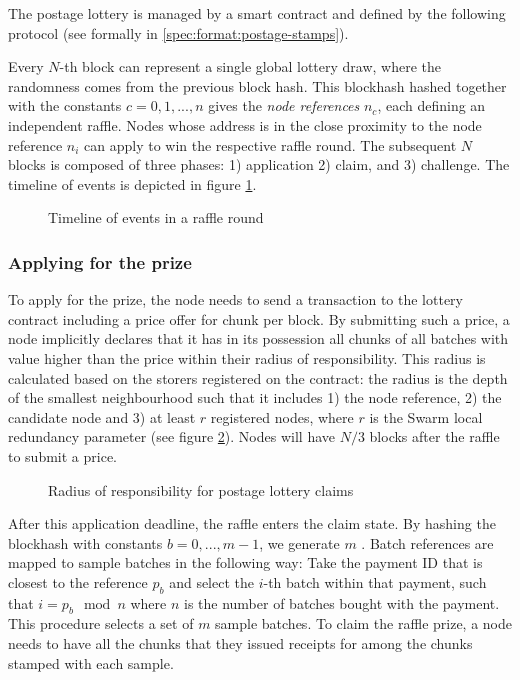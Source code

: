The postage lottery is managed by a smart contract and defined by the following protocol (see formally in \ref{spec:format:postage-stamps}). 

Every $N$-th block can represent a single global lottery draw, where the randomness comes from the previous block hash. This blockhash hashed together with the constants $c=0, 1, ..., n$ gives the \emph{node references} $n_c$, each defining an independent raffle. Nodes whose  address is in the close proximity to the node reference  $n_i$ can apply to win the respective raffle round. The subsequent $N$ blocks is composed of three phases: 1) application 2) claim, and 3) challenge. The timeline of events is depicted in figure \ref{fig:raffle-timeline}.

\begin{figure}[htbp]
  \centering
  \caption[Timeline of events in a raffle round]{Timeline of events in a raffle round}
  \label{fig:raffle-timeline}
\end{figure}


\subsubsection{Applying for the prize}

To apply for the prize, the node needs to send a transaction to the lottery contract including a price offer for chunk per block. By submitting such a price, a node implicitly declares that it has in its possession all chunks of all batches with value higher than the price within their radius of responsibility. This radius is calculated based on the storers registered on the contract: the radius is the depth of the smallest neighbourhood such that it includes 1) the node reference, 2) the candidate node and 3) at least $r$ registered nodes,  where $r$ is the Swarm local redundancy parameter (see figure \ref{fig:raffle-radius}). Nodes will have $N/3$ blocks after the raffle to submit a price.

\begin{figure}[htbp]
  \centering
  \caption[Radius of responsibility for postage lottery claims]{Radius of responsibility for postage lottery claims}
  \label{fig:raffle-radius}
\end{figure}

After this application deadline, the raffle enters the claim state. By hashing the blockhash with constants $b=0, ..., m-1$, we generate  $m$ . Batch references are mapped to sample batches in the following way: Take the payment ID that is closest to the reference $p_b$ and select the $i$-th batch within that payment, such that $i=p_b\mod n$ where $n$ is the number of batches bought with the payment. This procedure selects a set of $m$ sample batches. To claim the raffle prize, a node needs to have all the chunks that they issued receipts for among the chunks stamped with each sample. 


